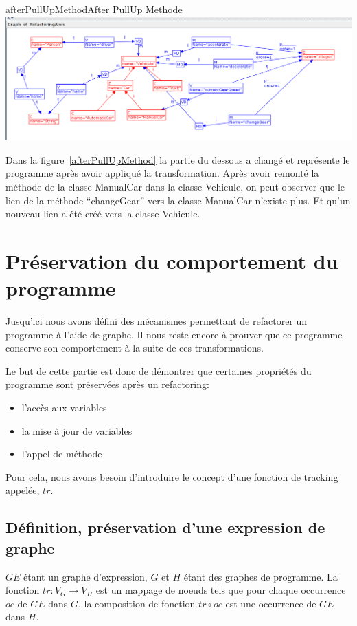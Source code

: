 \documentclass[a4paper, 12pt]{article}
\begin{document}
  \begin{myfig}{afterPullUpMethod}{After PullUp Methode}
    \includegraphics[width=\textwidth]{afterPullUpMethod.png}
  \end{myfig}

  Dans la figure~\ref{afterPullUpMethod} la partie du dessous a changé et représente le programme après avoir appliqué la transformation.
  Après avoir remonté la méthode de la classe ManualCar dans la classe Vehicule,
  on peut observer que le lien de la méthode ``changeGear'' vers la classe ManualCar n'existe plus. Et qu'un nouveau lien a été créé vers la classe Vehicule.

  \section{Préservation du comportement du programme}

  Jusqu'ici nous avons défini des mécanismes permettant de refactorer un programme à l'aide de graphe. Il nous reste encore à prouver que ce programme conserve son comportement à la suite de ces transformations.

  Le but de cette partie est donc de démontrer que certaines propriétés du programme sont préservées après un refactoring:
  \begin{itemize}[label=\textbullet]
    \item l'accès aux variables
    \item la mise à jour de variables
    \item l'appel de méthode
  \end{itemize}

  Pour cela, nous avons besoin d'introduire le concept d'une fonction de tracking appelée, \(tr\).

  \subsection{Définition, préservation d'une expression de graphe}

  \(GE\) étant un graphe d'expression, \(G\) et \(H\) étant des graphes de programme. La fonction \(tr: {V_G} \rightarrow {V_H}\)
  est un mappage de noeuds tels que pour chaque occurrence \( oc \) de $GE$ dans $G$, la composition de fonction  \(tr \circ oc \) est une occurrence de $GE$ dans $H$.
\end{document}
